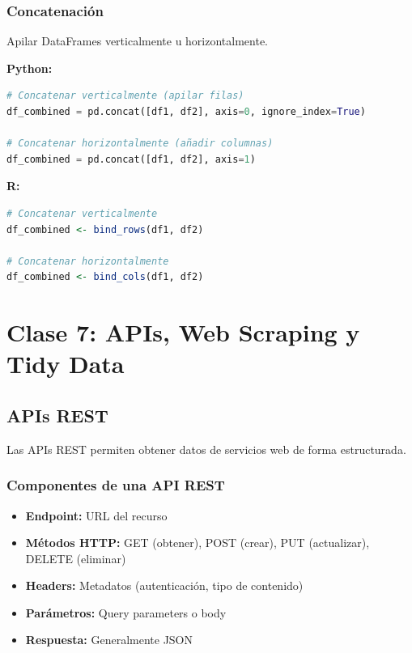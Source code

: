 \documentclass[a4paper,11pt]{article}
\begin{document}
\subsubsection{Concatenación}

Apilar DataFrames verticalmente u horizontalmente.

\textbf{Python:}
\begin{lstlisting}[language=Python]
# Concatenar verticalmente (apilar filas)
df_combined = pd.concat([df1, df2], axis=0, ignore_index=True)

# Concatenar horizontalmente (añadir columnas)
df_combined = pd.concat([df1, df2], axis=1)
\end{lstlisting}

\textbf{R:}
\begin{lstlisting}[language=R]
# Concatenar verticalmente
df_combined <- bind_rows(df1, df2)

# Concatenar horizontalmente
df_combined <- bind_cols(df1, df2)
\end{lstlisting}

\section{Clase 7: APIs, Web Scraping y Tidy Data}

\subsection{APIs REST}

Las APIs REST permiten obtener datos de servicios web de forma estructurada.

\subsubsection{Componentes de una API REST}

\begin{itemize}
    \item \textbf{Endpoint:} URL del recurso
    \item \textbf{Métodos HTTP:} GET (obtener), POST (crear), PUT (actualizar), DELETE (eliminar)
    \item \textbf{Headers:} Metadatos (autenticación, tipo de contenido)
    \item \textbf{Parámetros:} Query parameters o body
    \item \textbf{Respuesta:} Generalmente JSON
\end{itemize}
\end{document}
